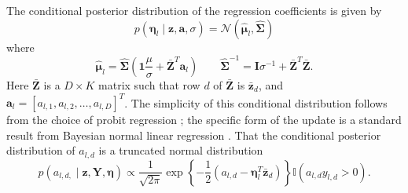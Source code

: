 The conditional posterior distribution of the regression coefficients is given by 
\begin{equation}
p(\boldsymbol\eta_{l}\mid\mathbf{z},\mathbf{a},\sigma) = \mathcal{N}(\hat{\boldsymbol\mu}_{l},\hat{\mathbf{\Sigma}})\label{eqn:regression_param_conditional}
\end{equation}
where
\begin{equation*}
\hat{\boldsymbol\mu}_{l}  =  \hat{\mathbf{\Sigma}}\left(\mathbf{1}\frac{\mu}{\sigma}+\bar{\mathbf{Z}}^{T}\mathbf{a}_{l}\right) \qquad \hat{\mathbf{\Sigma}}^{-1}  =  \mathbf{I}\sigma^{-1}+\bar{\mathbf{Z}}^{T}\bar{\mathbf{Z}}
.\end{equation*}
Here $\bar{\mathbf{Z}}$ is a $D\times K$ matrix
such that row $d$ of $\mathbf{\bar{Z}}$ is $\bar{\mathbf{z}}_{d}$, and $\mathbf{a}_{l}=[a_{l,1},a_{l,2},\ldots,a_{l,D}]^{T}$.  The simplicity of this conditional distribution follows from the choice of probit regression  \citep{Gelman}; the specific form of the update is a standard result from Bayesian normal  linear regression \citep{Gelman}. 
That the conditional posterior distribution of $a_{l,d}$ is a truncated normal distribution \begin{equation}
p\left(a_{l,d,}\mid\mathbf{z},\mathbf{Y},\mathbf{\boldsymbol\eta}\right)\propto\frac{1}{\sqrt{2\pi}}\exp\left\{ -\frac{1}{2}\left(a_{l,d}-\boldsymbol\eta_{l}^{T}\mathbf{\bar{z}}_{d}\right)\right\} \mathbb{I}\left(a_{l,d}y_{l,d}>0\right).\label{eqn:a_l_d}\end{equation}
